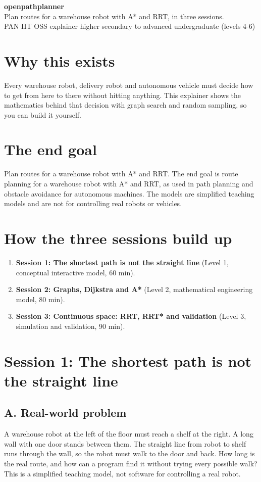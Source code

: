 \documentclass[11pt,a4paper]{article}
\begin{document}
\begin{center}{\LARGE\bfseries openpathplanner}\\[0.4em]{\large Plan routes for a warehouse robot with A* and RRT, in three sessions.}\\[0.2em]\small PAN IIT OSS explainer \textbullet{} higher secondary to advanced undergraduate (levels 4-6)\end{center}

\section*{Why this exists}
Every warehouse robot, delivery robot and autonomous vehicle must decide how to get from here to there without hitting anything. This explainer shows the mathematics behind that decision with graph search and random sampling, so you can build it yourself.

\section*{The end goal}
Plan routes for a warehouse robot with A* and RRT. The end goal is route planning for a warehouse robot with A* and RRT, as used in path planning and obstacle avoidance for autonomous machines. The models are simplified teaching models and are not for controlling real robots or vehicles.

\section*{How the three sessions build up}
\begin{enumerate}[nosep]
\item \textbf{Session 1: The shortest path is not the straight line} (Level 1, conceptual interactive model, 60 min).
\item \textbf{Session 2: Graphs, Dijkstra and A*} (Level 2, mathematical engineering model, 80 min).
\item \textbf{Session 3: Continuous space: RRT, RRT* and validation} (Level 3, simulation and validation, 90 min).
\end{enumerate}

\section{Session 1: The shortest path is not the straight line}

\subsection*{A. Real-world problem}
A warehouse robot at the left of the floor must reach a shelf at the right. A long wall with one door stands between them. The straight line from robot to shelf runs through the wall, so the robot must walk to the door and back. How long is the real route, and how can a program find it without trying every possible walk? This is a simplified teaching model, not software for controlling a real robot.
\end{document}
